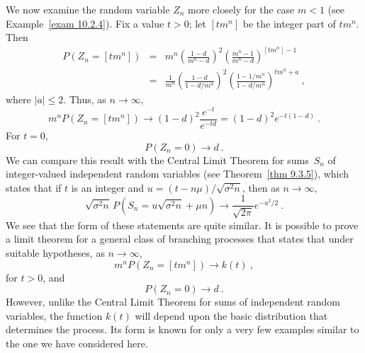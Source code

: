\begin{example}\label{exam 10.2.4.6}
We now examine the random variable $Z_n$ more closely for the case $m < 1$ (see
Example~\ref{exam 10.2.4}).  Fix a value $t > 0$; let $[tm^n]$ be the integer part of
$tm^n$.  Then
\begin{eqnarray*}
P(Z_n = [tm^n]) &=& m^n (\frac{1 - d}{m^n - d})^2 (\frac{m^n - 1}{m^n - d})
^{[tm^n] - 1} \\
                &=& \frac1{m^n}(\frac{1 - d}{1 - d/m^n})^2 (\frac{1 - 1/m^n} {1 -
d/m^n})^{tm^n + a}\ ,
\end{eqnarray*}
where $|a| \leq 2$.  Thus, as $n \to \infty$,
$$
m^n P(Z_n = [tm^n]) \to (1 - d)^2 \frac{e^{-t}}{e^{-td}} = (1 - d)^2 e^{-t(1 - d)}\ .
$$
For $t = 0$,
$$
P(Z_n = 0) \to d\ .
$$
We can compare this result with the Central Limit Theorem for sums~$S_n$ of
integer-valued independent random variables (see Theorem~\ref{thm 9.3.5}), which
states that if $t$ is an integer and $u = (t - n\mu)/\sqrt{\sigma^2 n}$, then
as $n \to \infty$,
$$
\sqrt{\sigma^2 n}\, P(S_n = u\sqrt{\sigma^2 n} + \mu n) \to \frac1{\sqrt{2\pi}}
e^{-u^2/2}\ .
$$
We see that the form of these statements are quite similar.  It is possible to
prove a limit theorem for a general class of branching processes that states
that under suitable hypotheses, as $n \to \infty$,
$$
m^n P(Z_n = [tm^n]) \to k(t)\ ,
$$
for $t > 0$, and
$$
P(Z_n = 0) \to d\ .
$$
However, unlike the Central Limit Theorem for sums of independent random
variables, the function $k(t)$ will depend upon the basic distribution that
determines the process.  Its form is known for only a very few examples similar
to the one we have considered here.
\end{example}

